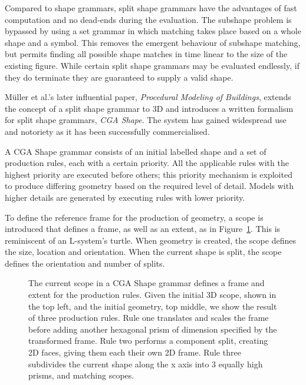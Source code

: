 Compared to shape grammars, split shape grammars have the advantages of fast computation and no dead-ends during the evaluation. The subshape problem is bypassed by using a set grammar\cite{Stiny82} in which matching takes place based on a whole shape and a symbol. This removes the emergent behaviour of subshape matching, but permits finding all possible shape matches in time linear to the size of the existing figure. While certain split shape grammars may be evaluated endlessly, if they do terminate they are guaranteed to supply a valid shape.

M\"{u}ller et al.'s later influential paper, \emph{Procedural Modeling of Buildings}\cite{Pascal06}, extends the concept of a split shape grammar to 3D and introduces a written formalism for split shape grammars, \emph{CGA Shape}. The system has gained widespread use and notoriety as it has been successfully commercialised\cite{cityEngine}.

A CGA Shape grammar consists of an initial labelled shape and a set of production rules, each with a certain priority. All the applicable rules with the highest priority are executed before others; this priority mechanism is exploited to produce differing geometry based on the required level of detail. Models with higher details are generated by executing rules with lower priority. 

To define the reference frame for the production of geometry, a scope is introduced that defines a frame, as well as an extent, as in Figure~\ref{fig:cgaScope}. This is reminiscent of an L-system's turtle. When geometry is created, the scope defines the size, location and orientation. When the current shape is split, the scope defines the orientation and number of splits.

\begin{figure}
\centering
\def\svgwidth{0.8\columnwidth}

\caption[CGA Shape's scope]{The current scope in a CGA Shape grammar defines a frame and extent for the production rules. Given the initial 3D scope, shown in the top left, and the initial geometry, top middle, we show the result of three production rules. Rule one translates and scales the frame before adding another hexagonal prism of dimension specified by the transformed frame. Rule two performs a component split, creating 2D faces, giving them each their own 2D frame. Rule three subdivides the current shape along the x axis into 3 equally high prisms, and matching scopes. }
\label{fig:cgaScope}
\end{figure}

